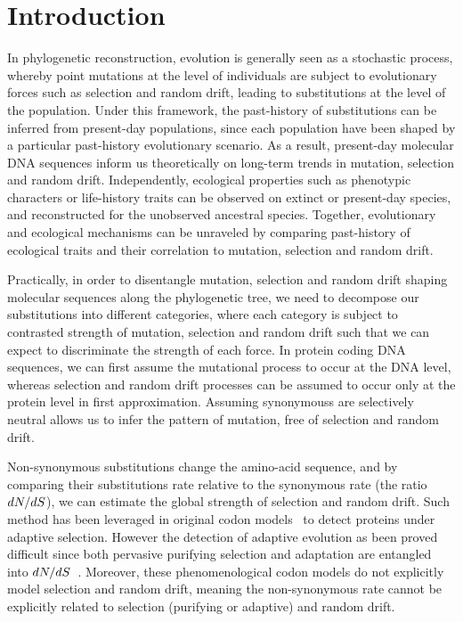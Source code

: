 

\section{Introduction}
\label{sec:Introduction}
In phylogenetic reconstruction, evolution is generally seen as a stochastic process, whereby point mutations at the level of individuals are subject to evolutionary forces such as selection and random drift, leading to \glspl{substitution} at the level of the population.
Under this framework, the past-history of \glspl{substitution} can be inferred from present-day populations, since each population have been shaped by a particular past-history evolutionary scenario.
As a result, present-day molecular \acrshort{DNA} sequences inform us theoretically on long-term trends in mutation, selection and random drift.
Independently, ecological properties such as phenotypic characters or life-history traits can be observed on extinct or present-day species, and reconstructed for the unobserved ancestral species.
Together, evolutionary and ecological mechanisms can be unraveled by comparing past-history of ecological traits and their correlation to mutation, selection and random drift.

Practically, in order to disentangle mutation, selection and random drift shaping molecular sequences along the phylogenetic tree, we need to decompose our \glspl{substitution} into different categories, where each category is subject to contrasted strength of mutation, selection and random drift such that we can expect to discriminate the strength of each force.
In protein coding \acrshort{DNA} sequences, we can first assume the mutational process to occur at the \acrshort{DNA} level, whereas selection and random drift processes can be assumed to occur only at the protein level in first approximation.
Assuming \glspl{synonymous} are selectively \gls{neutral} allows us to infer the pattern of mutation, free of selection and random drift.

Non-synonymous \glspl{substitution} change the amino-acid sequence, and by comparing their \glspl{substitution} rate relative to the \gls{synonymous} rate (the ratio $dN/dS$), we can estimate the global strength of selection and random drift.
Such method has been leveraged in original \gls{codon} models~\citep{Muse1994,Goldman1994} to detect proteins under adaptive selection.
However the detection of adaptive evolution as been proved difficult since both pervasive purifying selection and adaptation are entangled into $dN/dS$~\citep{Yang2000}.
Moreover, these phenomenological \gls{codon} models do not explicitly model selection and random drift, meaning the \gls{non-synonymous} rate cannot be explicitly related to selection (purifying or adaptive) and random drift.


